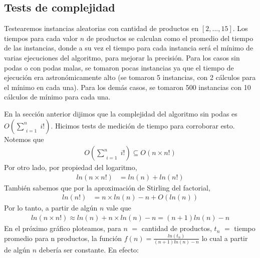 \subsection{Tests de complejidad}
Testearemos instancias aleatorias con cantidad de productos en $[2,...,15]$. Los tiempos para cada valor $n$ de productos se calculan como el promedio del tiempo de las instancias, donde a su vez el tiempo para cada instancia será el mínimo de varias ejecuciones del algoritmo, para mejorar la precisión. Para los casos sin podas o con podas malas, se tomaron pocas instancias ya que el tiempo de ejecución era astronómicamente alto (se tomaron 5 instancias, con 2 cálculos para el mínimo en cada una). Para los demás casos, se tomaron 500 instancias con 10 cálculos de mínimo para cada una.

En la sección anterior dijimos que la complejidad del algoritmo sin podas es $O\left(\sum\limits_{\substack{i = 1}}^n i!\right)$. Hicimos tests de medición de tiempo para corroborar esto. Notemos que 
\begin{align*}
O\left(\sum\limits_{\substack{i = 1}}^n i!\right) \subseteq O(n \times n!)
\end{align*}
Por otro lado, por propiedad del logaritmo, 
\begin{align*}
ln(n \times n!) &= ln(n) + ln(n!)
\end{align*}
También sabemos que por la aproximación de Stirling del factorial, 
\begin{align*}
ln(n!) &= n \times ln(n) - n + O(ln(n))
\end{align*}
Por lo tanto, a partir de algún $n$ vale que 
\begin{align*}
ln(n \times n!) \approx ln(n) + n \times ln(n) - n = (n+1) ln(n) - n
\end{align*}
En el próximo gráfico ploteamos, para $n$ $=$ cantidad de productos, $t_n$ $=$ tiempo promedio para n productos, la función $f(n) = \frac{ln(t_n)}{(n+1) ln(n) - n}$ lo cual a partir de algún $n$ debería ser constante. En efecto:

